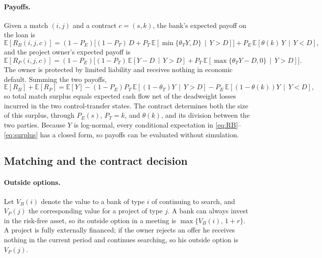 \documentclass[12pt]{article}
\newcommand{\E}{\mathbb{E}}
\newcommand{\RB}{R_B}
\newcommand{\RP}{R_P}
\begin{document}
\paragraph{Payoffs.}
Given a match $(i,j)$ and a contract $c = (s,k)$, the bank's expected payoff
on the loan is
\begin{equation}
  \E[\RB(i,j,c)] = (1 - P_E)\Big[(1 - P_T)\,D
    + P_T\, \E\!\left[\min\{\theta_T Y, D\}\,\middle|\, Y > D\right]\Big]
    + P_E\, \E\!\left[\theta(k)\, Y \,\middle|\, Y < D\right],
  \label{eq:RB}
\end{equation}
and the project owner's expected payoff is
\begin{equation}
  \E[\RP(i,j,c)] = (1 - P_E)\Big[(1 - P_T)\,\E\!\left[Y - D \,\middle|\, Y > D\right]
    + P_T\, \E\!\left[\max\{\theta_T Y - D, 0\} \,\middle|\, Y > D\right]\Big].
  \label{eq:RP}
\end{equation}
The owner is protected by limited liability and receives nothing in economic
default. Summing the two payoffs,
\begin{equation}
  \E[\RB] + \E[\RP] = \E[Y]
    - (1-P_E) P_T\, \E\!\left[(1-\theta_T) Y \,\middle|\, Y > D\right]
    - P_E\, \E\!\left[(1-\theta(k)) Y \,\middle|\, Y < D\right],
  \label{eq:surplus}
\end{equation}
so total match surplus equals expected cash flow net of the deadweight losses
incurred in the two control-transfer states. The contract determines both the
size of this surplus, through $P_E(s)$, $P_T = k$, and $\theta(k)$, and its
division between the two parties. Because $Y$ is log-normal, every
conditional expectation in \eqref{eq:RB}--\eqref{eq:surplus} has a closed
form, so payoffs can be evaluated without simulation.

\subsection{Matching and the contract decision}
\label{sec:matching}

\paragraph{Outside options.}
Let $V_B(i)$ denote the value to a bank of type $i$ of continuing to search,
and $V_P(j)$ the corresponding value for a project of type $j$. A bank can
always invest in the risk-free asset, so its outside option in a meeting is
$\max\{V_B(i),\, 1 + r\}$. A project is fully externally financed; if the
owner rejects an offer he receives nothing in the current period and
continues searching, so his outside option is $V_P(j)$.
\end{document}
